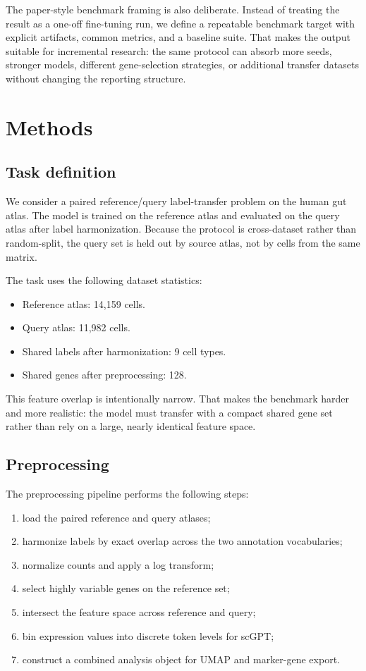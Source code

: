 \documentclass[11pt]{article}
\begin{document}
The paper-style benchmark framing is also deliberate.
Instead of treating the result as a one-off fine-tuning run, we define a repeatable benchmark target with explicit artifacts, common metrics, and a baseline suite.
That makes the output suitable for incremental research: the same protocol can absorb more seeds, stronger models, different gene-selection strategies, or additional transfer datasets without changing the reporting structure.

\section{Methods}
\subsection{Task definition}
We consider a paired reference/query label-transfer problem on the human gut atlas.
The model is trained on the reference atlas and evaluated on the query atlas after label harmonization.
Because the protocol is cross-dataset rather than random-split, the query set is held out by source atlas, not by cells from the same matrix.

The task uses the following dataset statistics:
\begin{itemize}[leftmargin=1.2em]
  \item Reference atlas: 14{,}159 cells.
  \item Query atlas: 11{,}982 cells.
  \item Shared labels after harmonization: 9 cell types.
  \item Shared genes after preprocessing: 128.
\end{itemize}

This feature overlap is intentionally narrow.
That makes the benchmark harder and more realistic: the model must transfer with a compact shared gene set rather than rely on a large, nearly identical feature space.

\subsection{Preprocessing}
The preprocessing pipeline performs the following steps:
\begin{enumerate}[leftmargin=1.2em]
  \item load the paired reference and query atlases;
  \item harmonize labels by exact overlap across the two annotation vocabularies;
  \item normalize counts and apply a log transform;
  \item select highly variable genes on the reference set;
  \item intersect the feature space across reference and query;
  \item bin expression values into discrete token levels for scGPT;
  \item construct a combined analysis object for UMAP and marker-gene export.
\end{enumerate}
\end{document}
